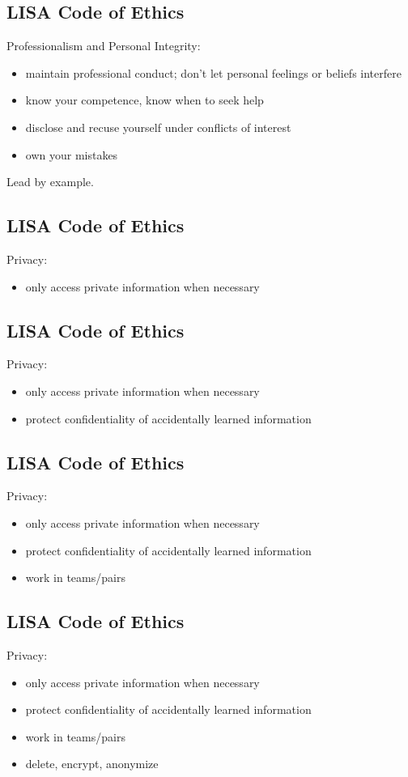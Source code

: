 \documentclass[xga]{xdvislides}
\begin{document}
\subsection{LISA Code of Ethics}
Professionalism and Personal Integrity:

\begin{itemize}
	\item maintain professional conduct; don't let
personal feelings or beliefs interfere
	\item know your competence, know when to seek help
	\item disclose and recuse yourself under conflicts of interest
	\item own your mistakes
\end{itemize}
\vspace{.5in}
Lead by example.

\subsection{LISA Code of Ethics}
Privacy:
\begin{itemize}
	\item only access private information when necessary
\end{itemize}

\subsection{LISA Code of Ethics}
Privacy:
\begin{itemize}
	\item only access private information when necessary
	\item protect confidentiality of accidentally learned information
\end{itemize}

\subsection{LISA Code of Ethics}
Privacy:
\begin{itemize}
	\item only access private information when necessary
	\item protect confidentiality of accidentally learned information
	\item work in teams/pairs
\end{itemize}

\subsection{LISA Code of Ethics}
Privacy:
\begin{itemize}
	\item only access private information when necessary
	\item protect confidentiality of accidentally learned information
	\item work in teams/pairs
	\item delete, encrypt, anonymize
\end{itemize}
\end{document}
